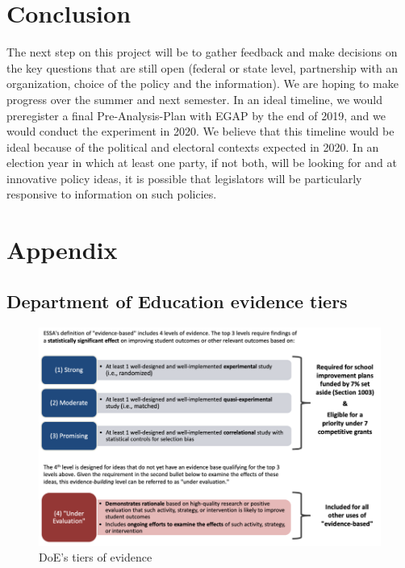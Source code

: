 \documentclass[12pt,final,fleqn]{article}
\theoremstyle{plain}
\begin{document}
\section{Conclusion} \label{sec:Conclusion}
The next step on this project will be to gather feedback and make decisions on the key questions that are still open (federal or state level, partnership with an organization, choice of the policy and the information). We are hoping to make progress over the summer and next semester. In an ideal timeline, we would preregister a final Pre-Analysis-Plan with EGAP by the end of 2019, and we would conduct the experiment in 2020. We believe that this timeline would be ideal because of the political and electoral contexts expected in 2020. In an election year in which at least one party, if not both, will be looking for and at innovative policy ideas, it is possible that legislators will be particularly responsive to information on such policies. 



\clearpage
\pagebreak


\pagebreak

\appendix
\setcounter{table}{0}
\setcounter{figure}{0}
\renewcommand\thetable{\Alph{section}.\arabic{table}}
\renewcommand\thefigure{\Alph{section}.\arabic{figure}}
\section{Appendix} \label{Appendix}

\subsection{Department of Education evidence tiers} \label{sec: DoE}
\begin{figure}[!htb]
\includegraphics{../figs/doe_tiers.png}
\bigbreak
\caption{DoE's tiers of evidence}
\label{fig: doe_tiers}
\end{figure}
\end{document}
